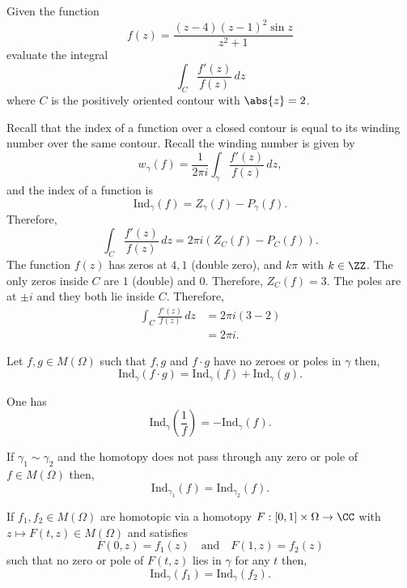 \documentclass[12pt, a4paper]{article}
\begin{document}
\begin{mdexample}
    Given the function 
    \[f(z)= \frac{(z-4)(z-1)^2\sin z}{z^2+1}\]
    evaluate the integral 
    \[\int_C \frac{f'(z)}{f(z)} \, dz\]
    where \(C\) is the positively oriented contour with \(\abs{z}=2\).
    \begin{solution}
        Recall that the index of a function over a closed contour is equal to its winding number over the same contour. Recall the winding number is given by 
        \[w_{\gamma}(f) = \frac{1}{2\pi i} \int_{\gamma} \frac{f'(z)}{f(z)} \, dz,\]
        and the index of a function is 
        \[\text{Ind}_{\gamma}(f)=Z_{\gamma}(f)-P_{\gamma}(f).\]
        Therefore, 
        \[\int_{C} \frac{f'(z)}{f(z)} \, dz = 2\pi i\left( Z_{C}(f)-P_{C}(f) \right).\]
        The function \(f(z)\) has zeros at \(4, 1\) (double zero), and \(k\pi\) with \(k \in \ZZ\). The only zeros inside \(C\) are \(1\) (double) and \(0\). Therefore, \(Z_C(f) = 3\). The poles are at \(\pm i\) and they both lie inside \(C\). Therefore,
        \[\begin{aligned}
            \int_{C} \frac{f'(z)}{f(z)} \, dz &= 2\pi i\left( 3-2\right) \\
            &= 2\pi i.
        \end{aligned}\]
    \end{solution}
\end{mdexample}

\begin{corollary}
    Let \(f,g\in M(\Omega)\) such that \(f,g\) and \(f \cdot g\) have no zeroes or poles in \(\gamma\) then,
    \[\text{Ind}_{\gamma}(f \cdot g)=\text{Ind}_{\gamma}(f)+\text{Ind}_{\gamma}(g).\]
\end{corollary}

\begin{corollary}
    One has 
    \[\text{Ind}_{\gamma}\left( \frac{1}{f} \right) = - \text{Ind}_{\gamma}(f).\]
\end{corollary}

\begin{mdthm}
    If \(\gamma_1 \sim \gamma_2\) and the homotopy does not pass through any zero or pole of \(f \in M(\Omega)\) then,
    \[\text{Ind}_{\gamma_1}(f)=\text{Ind}_{\gamma_2}(f).\]
\end{mdthm}

\begin{theorem}
    If \(f_1,f_2 \in M(\Omega)\) are homotopic via a homotopy \(F : [0,1] \times \Omega \to \CC\) with \(z \mapsto F(t,z) \in M(\Omega)\) and satisfies
    \[F(0,z)=f_1(z) \quad \text{and} \quad F(1,z)=f_2(z)\]
    such that no zero or pole of \(F(t,z)\) lies in \(\gamma\) for any \(t\) then,
    \[\text{Ind}_{\gamma}(f_1)=\text{Ind}_{\gamma}(f_2).\]
\end{theorem}
\end{document}
